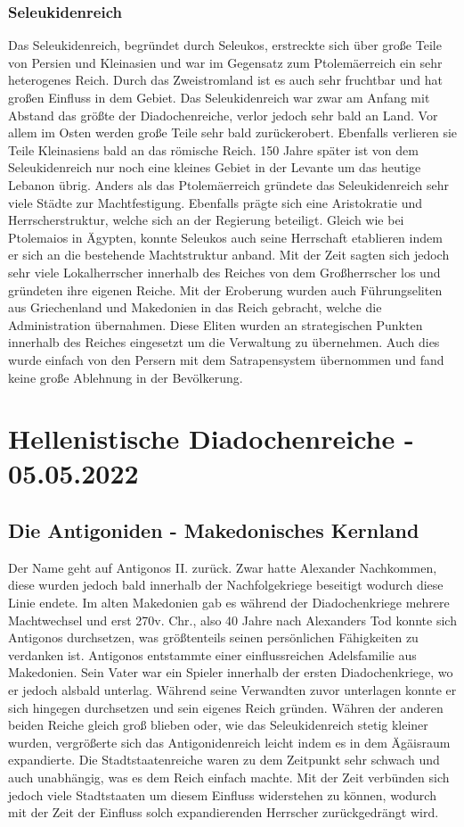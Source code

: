 \documentclass{article}
\begin{document}
	\subsubsection{Seleukidenreich}
	Das Seleukidenreich, begründet durch Seleukos, erstreckte sich über große Teile von Persien und Kleinasien und war im Gegensatz zum Ptolemäerreich ein sehr heterogenes Reich. Durch das Zweistromland ist es auch sehr fruchtbar und hat großen Einfluss in dem Gebiet. Das Seleukidenreich war zwar am Anfang mit Abstand das größte der Diadochenreiche, verlor jedoch sehr bald an Land. Vor allem im Osten werden große Teile sehr bald zurückerobert. Ebenfalls verlieren sie Teile Kleinasiens bald an das römische Reich. 150 Jahre später ist von dem Seleukidenreich nur noch eine kleines Gebiet in der Levante um das heutige Lebanon übrig. Anders als das Ptolemäerreich gründete das Seleukidenreich sehr viele Städte zur Machtfestigung. Ebenfalls prägte sich eine Aristokratie und Herrscherstruktur, welche sich an der Regierung beteiligt. Gleich wie bei Ptolemaios in Ägypten, konnte Seleukos auch seine Herrschaft etablieren indem er sich an die bestehende Machtstruktur anband. Mit der Zeit sagten sich jedoch sehr viele Lokalherrscher innerhalb des Reiches von dem Großherrscher los und gründeten ihre eigenen Reiche. Mit der Eroberung wurden auch Führungseliten aus Griechenland und Makedonien in das Reich gebracht, welche die Administration übernahmen. Diese Eliten wurden an strategischen Punkten innerhalb des Reiches eingesetzt um die Verwaltung zu übernehmen. Auch dies wurde einfach von den Persern mit dem Satrapensystem übernommen und fand keine große Ablehnung in der Bevölkerung.
	\section{Hellenistische Diadochenreiche - 05.05.2022}
	\subsection{Die Antigoniden - Makedonisches Kernland}
	Der Name geht auf Antigonos II. zurück. Zwar hatte Alexander Nachkommen, diese wurden jedoch bald innerhalb der Nachfolgekriege beseitigt wodurch diese Linie endete. Im alten Makedonien gab es während der Diadochenkriege mehrere Machtwechsel und erst 270v. Chr., also 40 Jahre nach Alexanders Tod konnte sich Antigonos durchsetzen, was größtenteils seinen persönlichen Fähigkeiten zu verdanken ist. Antigonos entstammte einer einflussreichen Adelsfamilie aus Makedonien. Sein Vater war ein Spieler innerhalb der ersten Diadochenkriege, wo er jedoch alsbald unterlag. Während seine Verwandten zuvor unterlagen konnte er sich hingegen durchsetzen und sein eigenes Reich gründen. Währen der anderen beiden Reiche gleich groß blieben oder, wie das Seleukidenreich stetig kleiner wurden, vergrößerte sich das Antigonidenreich leicht indem es in dem Ägäisraum expandierte. Die Stadtstaatenreiche waren zu dem Zeitpunkt sehr schwach und auch unabhängig, was es dem Reich einfach machte. Mit der Zeit verbünden sich jedoch viele Stadtstaaten um diesem Einfluss widerstehen zu können, wodurch mit der Zeit der Einfluss solch expandierenden Herrscher zurückgedrängt wird.
\end{document}
